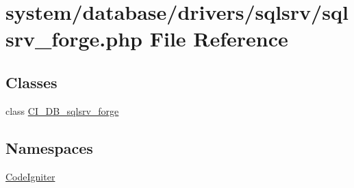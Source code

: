 \hypertarget{sqlsrv__forge_8php}{}\section{system/database/drivers/sqlsrv/sqlsrv\+\_\+forge.php File Reference}
\label{sqlsrv__forge_8php}
\subsection*{Classes}
\begin{DoxyCompactItemize}
\item 
class \mbox{\hyperlink{class_c_i___d_b__sqlsrv__forge}{C\+I\+\_\+\+D\+B\+\_\+sqlsrv\+\_\+forge}}
\end{DoxyCompactItemize}
\subsection*{Namespaces}
\begin{DoxyCompactItemize}
\item 
 \mbox{\hyperlink{namespace_code_igniter}{Code\+Igniter}}
\end{DoxyCompactItemize}
